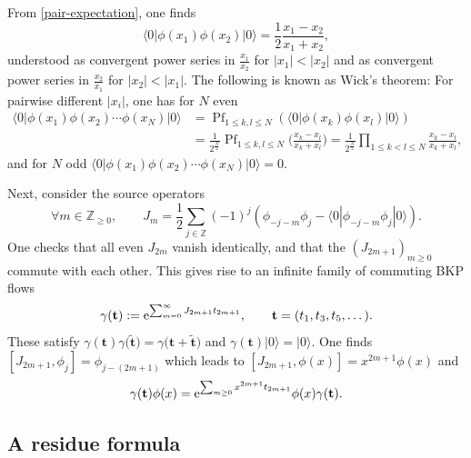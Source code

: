 \documentclass[10pt,a4paper]{amsart}
\numberwithin{equation}{section}
\begin{document}
From \eqref{pair-expectation}, one finds
\begin{equation*}
 \langle 0|\phi(x_1)\phi(x_2)|0\rangle
 =\frac{1}{2} \frac{x_1-x_2}{x_1+x_2},
\end{equation*}
understood as convergent power series in
$\frac{x_1}{x_2}$ for $|x_1|<|x_2|$ and as convergent power series in
$\frac{x_2}{x_1}$ for $|x_2|<|x_1|$. The following is known as Wick's theorem:
For pairwise different $|x_i|$, one has for $N$ even
\begin{align}
\nonumber
 \langle 0|\phi(x_1)\phi(x_2)\cdots
 \phi(x_{N})|0\rangle
 & =\operatorname{Pf}_{1\leq k,l \leq N}
 (\langle 0|\phi(x_k)\phi(x_l)|0\rangle) \\
 &= \frac{1}{2^{\frac{N}{2}}}
 \operatorname{Pf}_{1\leq k,l \leq N}
 \biggl(\frac{x_k-x_l}{x_k+x_l}\biggr)
= \frac{1}{2^{\frac{N}{2}}}\prod_{1\leq k<l\leq N}
\frac{x_k-x_l}{x_k+x_l},\label{Wick}
\end{align}
and for $N$ odd $\langle 0|\phi(x_1)\phi(x_2)\cdots
 \phi(x_{N})|0\rangle=0$.

Next, consider the source operators
\begin{equation*}
\forall m \in \mathbb{Z}_{\geq 0}, \qquad J_m = \frac{1}{2} \sum_{j\in\mathbb{Z}}(-1)^j(\phi_{-j-m}\phi_{j}-
 \langle 0 |\phi_{-j-m}\phi_{j}|0\rangle).
\end{equation*}
One checks that all even $J_{2m}$ vanish identically, and that the $(J_{2m+1})_{m \geq 0}$ commute with each other. This gives rise to an infinite
family of commuting BKP flows
\[
\gamma(\mathbf{t}) := {\rm e}^{\sum_{m=0}^\infty J_{2 m+1} t_{2m+1} },\qquad
\mathbf{t}=(t_1,t_3,t_5,\dots).
\]
These satisfy $\gamma(\mathbf{t}) \gamma\bigl(\tilde{\mathbf{t}}\bigr)
= \gamma\bigl(\mathbf{t}+\tilde{\mathbf{t}}\bigr)$ and $\gamma(\mathbf{t})|0\rangle
=|0\rangle$. One finds $[J_{2m+1},\phi_j]=\phi_{j-(2m+1)}$ which leads to
$[J_{2m+1},\phi(x)]=x^{2m+1} \phi(x)$ and
\begin{equation}
\label{gammatphiz}
 \gamma(\mathbf{t}) \phi(x)=
 {\rm e}^{\sum_{m \geq 0} x^{2 m+1} t_{2m+1} } \phi(x)\gamma(\mathbf{t}).
\end{equation}

\subsection{A residue formula}
\end{document}
